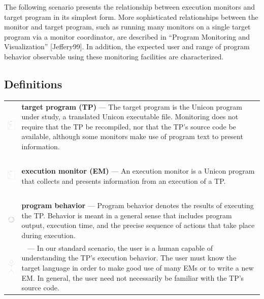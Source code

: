 The following scenario presents the relationship between execution monitors
and target program in its simplest form.  More sophisticated relationships
between the monitor and target program, such as running many monitors on a
single target program via a monitor coordinator, are described in ``Program
Monitoring and Visualization'' [Jeffery99].  In addition, the expected user
and range of program behavior observable using these monitoring facilities
are characterized.

\subsection*{Definitions}

\begin{tabular}{m{0.95in} m{4.75in}}
\includegraphics[width=0.65in,height=0.85in]{tp.png} &
{\bf target program (TP)} ---
The target program is the Unicon program under study, a translated Unicon
executable file.
Monitoring does not require that the TP be recompiled, nor that
the TP's source code be available, although some monitors make use of
program text to present information. \index{target program!Alamo} \\
\includegraphics[width=0.65in,height=0.85in]{em.png} &
{\bf execution monitor (EM)} ---
An execution monitor is a Unicon program that collects and presents
information from an execution of a TP. \index{execution monitor!Alamo} \\
\includegraphics[width=0.6in,height=0.6in]{behave.png} &
{\bf program behavior} ---
Program behavior denotes the results of executing the TP.  Behavior is meant
in a general sense
that includes program output, execution time, and the precise sequence
of actions that take place during execution. \index{program behavior} \\
\includegraphics[height=0.7in]{user.png} &
\ \linebreak {\bf user} --- In our standard
scenario, the user is a human capable of understanding the TP's execution
behavior.  The user must know the target language in order to make good use
of many EMs or to write a new
EM.  In general, the user need not necessarily be familiar with the TP's
source code. \index{user!Alamo} \\
\end{tabular}

